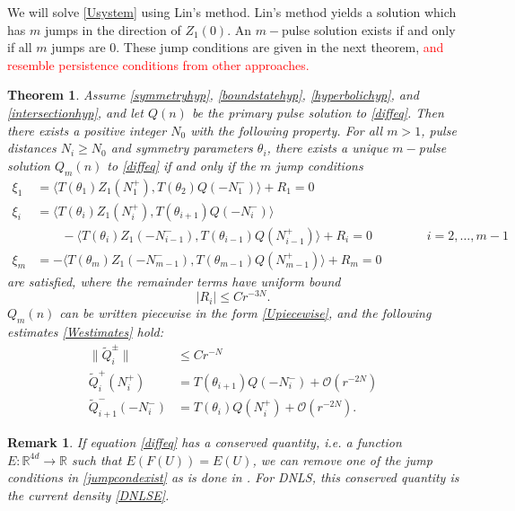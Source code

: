\documentclass[12pt]{elsarticle}
\def\R{{\mathbb R}}
\newtheorem{theorem}{Theorem}
\newtheorem{remark}{Remark}
\newcommand{\revised}[1]{ \textcolor{red}{#1} }
\begin{document}
We will solve \cref{Usystem} using Lin's method. Lin's method yields a solution which has $m$ jumps in the direction of $Z_1(0)$. An $m-$pulse solution exists if and only if all $m$ jumps are 0. These jump conditions are given in the next theorem, \revised{and resemble persistence conditions from other approaches.}

\begin{theorem}\label{ntmulti}
Assume \cref{symmetryhyp}, \cref{boundstatehyp}, \cref{hyperbolichyp}, and \cref{intersectionhyp}, and let $Q(n)$ be the primary pulse solution to \cref{diffeq}. Then there exists a positive  integer $N_0$ with the following property. For all $m > 1$, pulse distances $N_i \geq N_0$ and symmetry parameters $\theta_i$, there exists a unique $m-$pulse solution $Q_m(n)$ to \cref{diffeq} if and only if the $m$ jump conditions 
\begin{equation}\label{jumpcondexist}
\begin{aligned}
\xi_1 &= \langle T(\theta_1) Z_1(N_1^+), T(\theta_{2}) Q(-N_1^-) \rangle + R_1 = 0 \\
\xi_i &= \langle T(\theta_i) Z_1(N_i^+), T(\theta_{i+1}) Q(-N_i^-) \rangle \\
&\qquad-\langle T(\theta_i) Z_1(-N_{i-1}^-), T(\theta_{i-1}) Q(N_{i-1}^+) \rangle + R_i = 0 && \qquad i = 2, \dots, m-1 \\
\xi_m &= -\langle T(\theta_m) Z_1(-N_{m-1}^-), T(\theta_{m-1}) Q(N_{m-1}^+) \rangle + R_m = 0
\end{aligned}
\end{equation}
are satisfied, where the remainder terms have uniform bound
\[
|R_i| \leq C r^{-3N}.
\]
$Q_m(n)$ can be written piecewise in the form \cref{Upiecewise}, and the following estimates \cref{Westimates} hold:
\begin{equation}\label{Westimates}
\begin{aligned}
\|\tilde{Q}_i^\pm\| &\leq C r^{-N} \\
\tilde{Q}_i^+(N_i^+) &= T(\theta_{i+1}) Q(-N_i^-) + \mathcal{O}(r^{-2N}) \\
\tilde{Q}_{i+1}^-(-N_i^-) &= T(\theta_i) Q(N_i^+) + \mathcal{O}(r^{-2N}) .
\end{aligned}
\end{equation}
\end{theorem}

\begin{remark}If equation \cref{diffeq} has a conserved quantity, i.e. a function $E: \R^{4d} \rightarrow \R$ such that $E(F(U)) = E(U)$, we can remove one of the jump conditions in \cref{jumpcondexist} as is done in \cite{SandstedeStrut}. For DNLS, this conserved quantity is the current density \cref{DNLSE}.
\end{remark}
\end{document}
